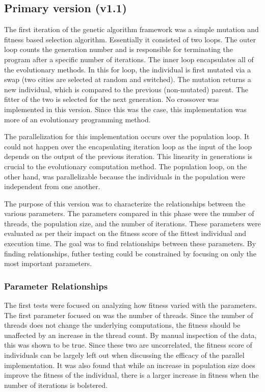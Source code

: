 \documentclass[10pt,letterpaper]{article}
\begin{document}
\subsection{Primary version (v1.1)}
The first iteration of the genetic algorithm framework was a simple mutation and fitness based selection algorithm. Essentially it consisted of two loops. The outer loop counts the generation number and is responsible for terminating the program after a specific number of iterations. The inner loop encapsulates all of the evolutionary methods. In this for loop, the individual is first mutated via a swap (two cities are selected at random and switched). The mutation returns a new individual, which is compared to the previous (non-mutated) parent. The fitter of the two is selected for the next generation. No crossover was implemented in this version. Since this was the case, this implementation was more of an evolutionary programming method. 

The parallelization for this implementation occurs over the population loop. It could not happen over the encapsulating iteration loop as the input of the loop depends on the output of the previous iteration. This linearity in generations is crucial to the evolutionary computation method. The population loop, on the other hand, was parallelizable because the individuals in the population were independent from one another.

The purpose of this version was to characterize the relationships between the various parameters. The parameters compared in this phase were the number of threads, the population size, and the number of iterations. These parameters were evaluated as per their impact on the fitness score of the fittest individual and execution time. The goal was to find relationships between these parameters. By finding relationships, futher testing could be constrained by focusing on only the most important parameters. 


\subsubsection{Parameter Relationships}
The first tests were focused on analyzing how fitness varied with the parameters. The first parameter focused on was the number of threads. Since the number of threads does not change the underlying computations, the fitness should be unaffected by an increase in the thread count. By manual inspection of the data, this was shown to be true. Since these two are uncorrelated, the fitness score of individuals can be largely left out when discussing the efficacy of the parallel implementation. It was also found that while an increase in population size does improve the fitness of the individual, there is a larger increase in fitness when the number of iterations is bolstered.
\end{document}
